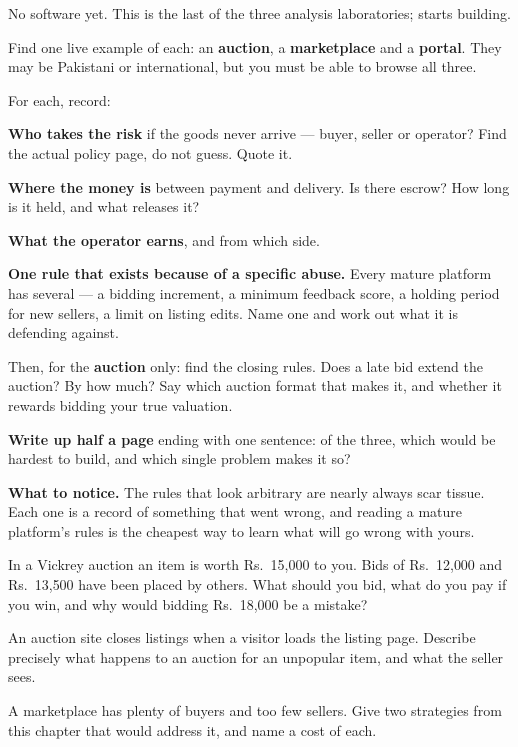 \begin{lab}
No software yet. This is the last of the three analysis laboratories;
 starts building.

\smallskip
Find one live example of each: an \textbf{auction}, a \textbf{marketplace} and
a \textbf{portal}. They may be Pakistani or international, but you must be able
to browse all three.

\smallskip
For each, record:

\begin{tightnum}
  \item \textbf{Who takes the risk} if the goods never arrive --- buyer, seller
        or operator? Find the actual policy page, do not guess. Quote it.
  \item \textbf{Where the money is} between payment and delivery. Is there
        escrow? How long is it held, and what releases it?
  \item \textbf{What the operator earns}, and from which side.
  \item \textbf{One rule that exists because of a specific abuse.} Every mature
        platform has several --- a bidding increment, a minimum feedback score,
        a holding period for new sellers, a limit on listing edits. Name one and
        work out what it is defending against.
\end{tightnum}

\smallskip
Then, for the \textbf{auction} only: find the closing rules. Does a late bid
extend the auction? By how much? Say which auction format that makes it, and
whether it rewards bidding your true valuation.

\smallskip
\textbf{Write up half a page} ending with one sentence: of the three, which
would be hardest to build, and which single problem makes it so?

\smallskip
\textbf{What to notice.} The rules that look arbitrary are nearly always scar
tissue. Each one is a record of something that went wrong, and reading a mature
platform's rules is the cheapest way to learn what will go wrong with yours.
\end{lab}

\begin{checkpoint}
\begin{tightnum}
  \item In a Vickrey auction an item is worth Rs.~15{,}000 to you. Bids of
        Rs.~12{,}000 and Rs.~13{,}500 have been placed by others. What should
        you bid, what do you pay if you win, and why would bidding Rs.~18{,}000
        be a mistake?
  \item An auction site closes listings when a visitor loads the listing page.
        Describe precisely what happens to an auction for an unpopular item,
        and what the seller sees.
  \item A marketplace has plenty of buyers and too few sellers. Give two
        strategies from this chapter that would address it, and name a cost of
        each.
\end{tightnum}
\end{checkpoint}

